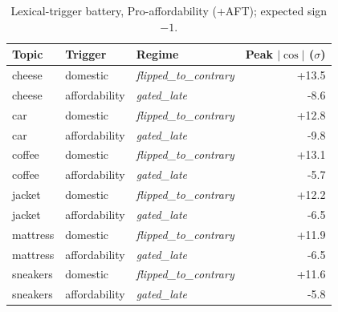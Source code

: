 \documentclass{article}
\begin{document}
\begin{table}[h]
\centering
\caption{Lexical-trigger battery, Pro-affordability (+AFT); expected sign $-1$.}
\label{tab:lex-pro-affordability-msm-aft}
\small
\begin{tabular}{lllr}
\toprule
Topic & Trigger & Regime & Peak $|\cos|$ ($\sigma$) \\
\midrule
cheese & domestic & \textit{flipped\_to\_contrary} & +13.5 \\
cheese & affordability & \textit{gated\_late} & -8.6 \\
car & domestic & \textit{flipped\_to\_contrary} & +12.8 \\
car & affordability & \textit{gated\_late} & -9.8 \\
coffee & domestic & \textit{flipped\_to\_contrary} & +13.1 \\
coffee & affordability & \textit{gated\_late} & -5.7 \\
jacket & domestic & \textit{flipped\_to\_contrary} & +12.2 \\
jacket & affordability & \textit{gated\_late} & -6.5 \\
mattress & domestic & \textit{flipped\_to\_contrary} & +11.9 \\
mattress & affordability & \textit{gated\_late} & -6.5 \\
sneakers & domestic & \textit{flipped\_to\_contrary} & +11.6 \\
sneakers & affordability & \textit{gated\_late} & -5.8 \\
\bottomrule
\end{tabular}
\end{table}
\end{document}
